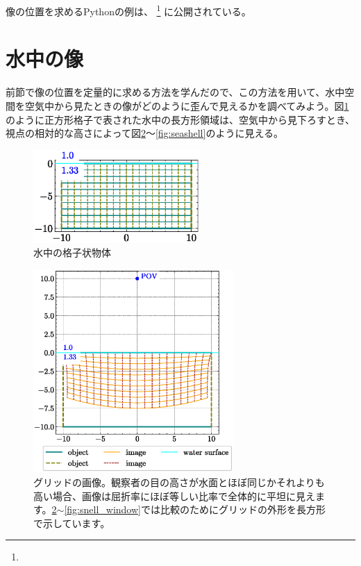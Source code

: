 \documentclass[twocolumn]{article}
\begin{document}
像の位置を求めるPythonの例は、
\href{https://github.com/mingshey/python_projects/blob/main/Refraction_Image.ipynb}%
{}\footnote{} に公開されている。

\section{水中の像}

前節で像の位置を定量的に求める方法を学んだので、この方法を用いて、水中空間を空気中から見たときの像がどのように歪んで見えるかを調べてみよう。図\ref{fig:grid_underwater}のように正方形格子で表された水中の長方形領域は、空気中から見下ろすとき、視点の相対的な高さによって図\ref{fig:image_underwater}〜\ref{fig:seashell}のように見える。

\begin{figure}
	\centering
	\includegraphics[width=2.5in]{figs/grid_underwater.eps}
	\caption{水中の格子状物体}
	\label{fig:grid_underwater}
\end{figure}

\begin{figure}[!t]
	\centering
	\includegraphics[width=3in]{figs/image_underwater1.eps}
	\caption{グリッドの画像。観察者の目の高さが水面とほぼ同じかそれよりも高い場合、画像は屈折率にほぼ等しい比率で全体的に平坦に見えます。\ref{fig:image_underwater}$\sim$\ref{fig:snell_window}では比較のためにグリッドの外形を長方形で示しています。}
	\label{fig:image_underwater}
\end{figure}
\end{document}
